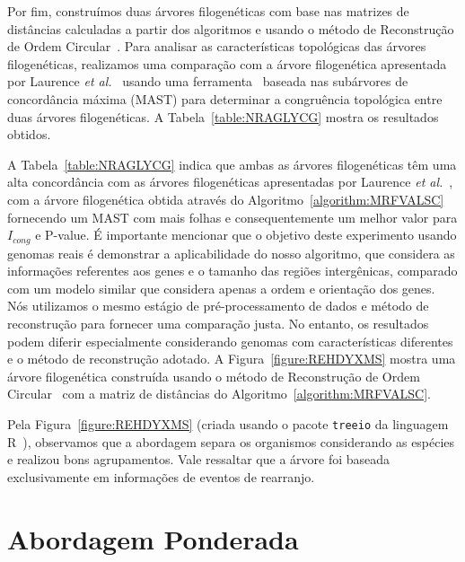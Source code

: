 Por fim, construímos duas árvores filogenéticas com base nas matrizes de distâncias calculadas a partir dos algoritmos e usando o método de Reconstrução de Ordem Circular~\cite{makarenkov1997tree}. Para analisar as características topológicas das árvores filogenéticas, realizamos uma comparação com a árvore filogenética apresentada por Laurence \textit{et al.}~\cite{garczarek2020cyanorak} usando uma ferramenta~\cite{de2007congruence} baseada nas subárvores de concordância máxima (MAST) para determinar a congruência topológica entre duas árvores filogenéticas. A Tabela~\ref{table:NRAGLYCG} mostra os resultados obtidos.



A Tabela~\ref{table:NRAGLYCG} indica que ambas as árvores filogenéticas têm uma alta concordância com as árvores filogenéticas apresentadas por Laurence \textit{et al.}~\cite{garczarek2020cyanorak}, com a árvore filogenética obtida através do Algoritmo~\ref{algorithm:MRFVALSC} fornecendo um MAST com mais folhas e consequentemente um melhor valor para $I_{cong}$ e P-value. É importante mencionar que o objetivo deste experimento usando genomas reais é demonstrar a aplicabilidade do nosso algoritmo, que considera as informações referentes aos genes e o tamanho das regiões intergênicas, comparado com um modelo similar que considera apenas a ordem e orientação dos genes. Nós utilizamos o mesmo estágio de pré-processamento de dados e método de reconstrução para fornecer uma comparação justa. No entanto, os resultados podem diferir especialmente considerando genomas com características diferentes e o método de reconstrução adotado. A Figura~\ref{figure:REHDYXMS} mostra uma árvore filogenética construída usando o método de Reconstrução de Ordem Circular~\cite{makarenkov1997tree} com a matriz de distâncias do Algoritmo~\ref{algorithm:MRFVALSC}.



Pela Figura~\ref{figure:REHDYXMS} (criada usando o pacote \texttt{treeio} da linguagem R~\cite{wang2020treeio}), observamos que a abordagem separa os organismos considerando as espécies e realizou bons agrupamentos. Vale ressaltar que a árvore foi baseada exclusivamente em informações de eventos de rearranjo.

\section{Abordagem Ponderada}

